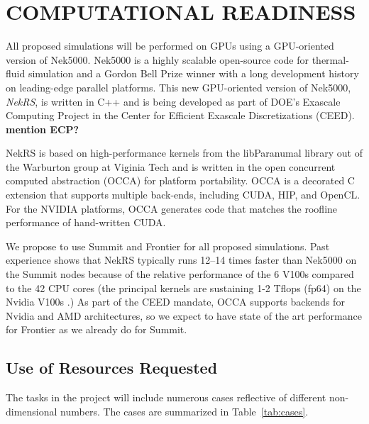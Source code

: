 \newpage
\vspace{-.25in}
\section{COMPUTATIONAL READINESS} %
\vspace{-.2in}

All proposed simulations will be performed on GPUs using a GPU-oriented version
of Nek5000. Nek5000 is a highly scalable open-source code for thermal-fluid 
simulation and a Gordon Bell Prize winner \cite{tufo99} with a long development
history on leading-edge parallel platforms. This new GPU-oriented version of Nek5000,
{\it NekRS}, is written in C++ and is being developed as part of DOE's Exascale Computing
Project in the Center for Efficient Exascale Discretizations (CEED). {\bf mention ECP?}

NekRS is based on high-performance kernels from the libParanumal library
out of the Warburton group at Viginia Tech and is written in the open
concurrent computed abstraction (OCCA) for platform portability.  OCCA
is a decorated C extension that supports multiple back-ends, including CUDA,
HIP, and OpenCL. For the NVIDIA platforms, OCCA generates code that matches
the roofline performance of hand-written CUDA. 

We propose to use Summit and Frontier for all proposed simulations. Past experience shows that
NekRS typically
runs 12--14 times faster than Nek5000 on the Summit nodes because of the
relative performance of the 6 V100s compared to the 42 CPU cores (the
principal kernels are sustaining 1-2 Tflops (fp64) on the Nvidia V100s
\cite{fischer20a,warburton2019}.) As part of the CEED mandate, OCCA supports
backends for Nvidia and AMD architectures, so we expect to have state of the
art performance for Frontier as we already do for Summit.

\vspace{-.25in}
\subsection{Use of Resources Requested}
\vspace{-.2in}

The tasks in the project will include numerous cases reflective of different
non-dimensional numbers. The cases are summarized in Table~\ref{tab:cases}.

